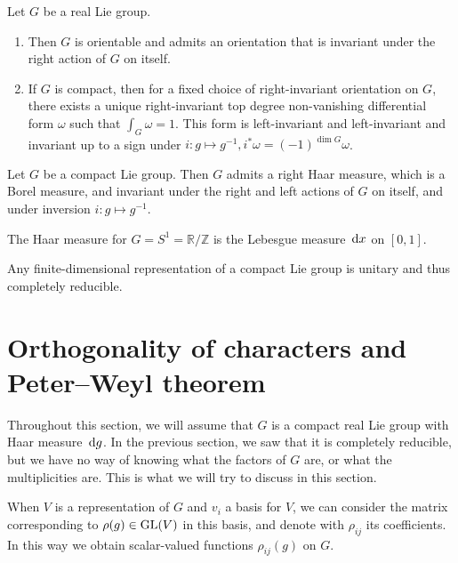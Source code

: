 \documentclass{report}
\begin{document}
\begin{theorem}
    Let $G$ be a real Lie group.
    \begin{enumerate}
        \item Then $G$ is orientable and admits an orientation that is invariant under the right action of $G$ on itself.
        \item If $G$ is compact, then for a fixed choice of right-invariant orientation on $G$, there exists a unique right-invariant top degree non-vanishing differential form $\omega$ such that $\int_G \omega = 1$.
        This form is left-invariant and left-invariant  and invariant up to a sign under $i: g 
    \mapsto g^{-1}, i^*\omega = (-1)^{\dim G} \omega$.
    \end{enumerate}
\end{theorem}

\begin{theorem}
    Let $G$ be a compact Lie group.
    Then $G$ admits a right Haar measure, which is a Borel measure, and invariant under the right and left actions of $G$ on itself, and under inversion $i: g \mapsto g^{-1}$.
\end{theorem}

\begin{example}
    The Haar measure for $G= S^1 = \mathbb R/ \mathbb Z$ is the Lebesgue measure $\,\mathrm{d} x$ on $[0, 1]$.
\end{example}

\begin{theorem}\label{thm:compact_implies_unitary}
    Any finite-dimensional representation of a compact Lie group is unitary and thus completely reducible.
\end{theorem}

\section{Orthogonality of characters and Peter--Weyl theorem}
Throughout this section, we will assume that $G$ is a compact real Lie group with Haar measure $\,\mathrm{d} g$.
In the previous section, we saw that it is completely reducible, but we have no way of knowing what the factors of $G$ are, or what the multiplicities are.
This is what we will try to discuss in this section.

When $V$ is a representation of $G$ and $v_i$ a basis for $V$, we can consider the matrix corresponding to $\rho(g) \in \operatorname{{\mathrm{GL}}}(V)$ in this basis, and denote with $\rho_{ij}$ its coefficients.
In this way we obtain scalar-valued functions $\rho_{ij}(g)$ on $G$.
\end{document}
